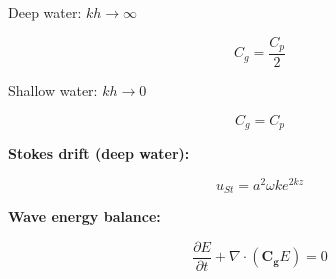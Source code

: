 \documentclass[12pt]{article}
\numberwithin{equation}{section}
\numberwithin{figure}{section}
\numberwithin{table}{section}
\begin{document}
Deep water: $kh \to \infty$

\begin{equation}
  C_g = \frac{C_p}{2}
\end{equation}

Shallow water: $kh \to 0$

\begin{equation}
  C_g = C_p
\end{equation}

\textbf{Stokes drift (deep water):}

\begin{equation}
  u_{St} = a^2 \omega k e^{2kz}
\end{equation}

\textbf{Wave energy balance:}

\begin{equation}
  \frac{\partial E}{\partial t} + \nabla \cdot \left( \mathbf{C_g} E \right) = 0
\end{equation}

\printindex
\end{document}
